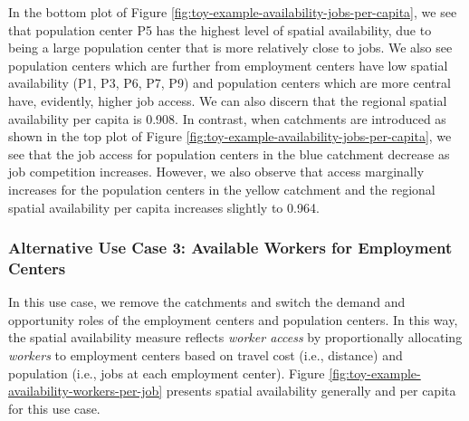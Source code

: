 \documentclass[]{elsarticle} %
\begin{document}
In the bottom plot of Figure
\ref{fig:toy-example-availability-jobs-per-capita}, we see that
population center P5 has the highest level of spatial availability, due
to being a large population center that is more relatively close to
jobs. We also see population centers which are further from employment
centers have low spatial availability (P1, P3, P6, P7, P9) and
population centers which are more central have, evidently, higher job
access. We can also discern that the regional spatial availability per
capita is 0.908. In contrast, when catchments are introduced as shown in
the top plot of Figure
\ref{fig:toy-example-availability-jobs-per-capita}, we see that the job
access for population centers in the blue catchment decrease as job
competition increases. However, we also observe that access marginally
increases for the population centers in the yellow catchment and the
regional spatial availability per capita increases slightly to 0.964.

\hypertarget{alternative-use-case-3-available-workers-for-employment-centers}{%
\subsubsection{Alternative Use Case 3: Available Workers for Employment
Centers}\label{alternative-use-case-3-available-workers-for-employment-centers}}

In this use case, we remove the catchments and switch the demand and
opportunity roles of the employment centers and population centers. In
this way, the spatial availability measure reflects \emph{worker access}
by proportionally allocating \emph{workers} to employment centers based
on travel cost (i.e., distance) and population (i.e., jobs at each
employment center). Figure
\ref{fig:toy-example-availability-workers-per-job} presents spatial
availability generally and per capita for this use case.
\end{document}
